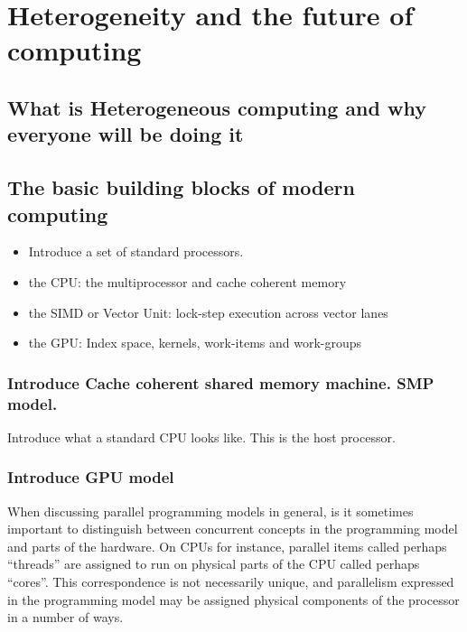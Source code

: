
\def\ArtDir{01.HeteroComp/figures}%

\chapter{Heterogeneity and the future of computing}
\label{chapter:heterogeneity}

\section{What is Heterogeneous computing and why everyone will be doing it}

\section{The basic building blocks of modern computing}

\begin{itemize}
\item Introduce a set of standard processors.
\item  the CPU: the multiprocessor and cache coherent memory
\item  the SIMD or Vector Unit: lock-step execution across vector lanes
\item  the GPU:  Index space, kernels, work-items and work-groups
\end{itemize}

\subsection{Introduce Cache coherent shared memory machine. SMP model.}
Introduce what a standard CPU looks like. This is the host processor.

\subsection{Introduce GPU model}
When discussing parallel programming models in general, is it sometimes important to distinguish between concurrent concepts in the programming model and parts of the hardware.
On CPUs for instance, parallel items called perhaps ``threads'' are assigned to run on physical parts of the CPU called perhaps ``cores''.
This correspondence is not necessarily unique, and parallelism expressed in the programming model may be assigned physical components of the processor in a number of ways.

